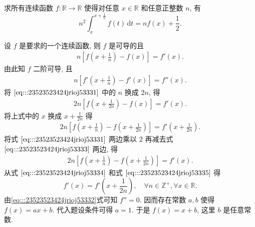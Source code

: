 \documentclass[../../main.tex]{subfiles}
\begin{document}
\begin{example}
求所有连续函数 \( f : \mathbb{R} \to \mathbb{R} \) 使得对任意 \( x \in \mathbb{R} \) 和任意正整数 \( n \), 有  
\[
n^2 \int_{x}^{x + \frac{1}{n}} f(t) \, \mathrm{d}t = n f(x) + \frac{1}{2}.
\]  
\end{example}
\begin{solution}
设 \( f \) 是要求的一个连续函数, 则 \( f \) 是可导的且  
\begin{align}
n \left[ f \left( x + \frac{1}{n} \right) - f(x) \right] = f'(x). \label{eq:::23523523424jrioj53331}
\end{align}  
由此知 \( f \) 二阶可导, 且  
\begin{align}
n \left[ f' \left( x + \frac{1}{n} \right) - f'(x) \right] = f''(x). \label{eq:::23523523424jrioj53332}
\end{align}  
将 \(\eqref{eq:::23523523424jrioj53331}\) 中的 \( n \) 换成 \( 2n \), 得  
\begin{align}
2n \left[ f \left( x + \frac{1}{2n} \right) - f(x) \right] = f'(x). \label{eq:::23523523424jrioj53333}
\end{align}  
将上式中的 \( x \) 换成 \( x + \frac{1}{2n} \) 得  
\begin{align}
2n \left[ f \left( x + \frac{1}{n} \right) - f \left( x + \frac{1}{2n} \right) \right] = f' \left( x + \frac{1}{2n} \right). \label{eq:::23523523424jrioj53334}
\end{align}  
将式 \(\eqref{eq:::23523523424jrioj53331}\) 两边乘以 \( 2 \) 再减去式 \(\eqref{eq:::23523523424jrioj53333}\) 两边, 得  
\begin{align}
2n \left[ f \left( x + \frac{1}{n} \right) - f \left( x + \frac{1}{2n} \right) \right] = f'(x). \label{eq:::23523523424jrioj53335}
\end{align}  
从式 \(\eqref{eq:::23523523424jrioj53334}\) 和式 \(\eqref{eq:::23523523424jrioj53335}\) 得  
\[
f'(x) = f' \left( x + \frac{1}{2n} \right), \quad \forall n \in \mathbb{Z}^+, \forall x \in \mathbb{R}.
\]  
由\eqref{eq:::23523523424jrioj53332}式可知 \( f'' = 0 \). 因而存在常数 \( a, b \) 使得 \( f(x) = ax + b \). 代入题设条件可得 \( a = 1 \). 于是 \( f(x) = x + b \), 这里 \( b \) 是任意常数.

\end{solution}
\end{document}
